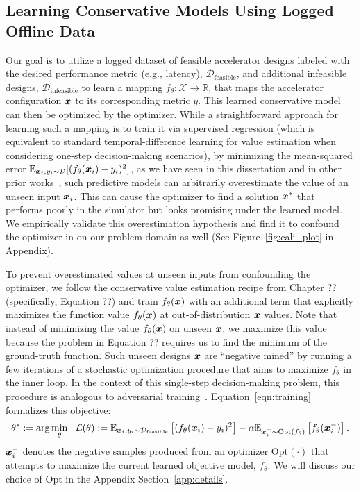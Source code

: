 \subsection{Learning Conservative Models Using Logged Offline Data}
Our goal is to utilize a logged dataset of feasible accelerator designs labeled with the desired performance metric (e.g., latency),  $\mathcal{D}_\text{feasible}$, and additional infeasible designs, $\mathcal{D}_\text{infeasible}$ to learn a mapping ${f}_\theta: \mathcal{X} \rightarrow \mathbb{R}$, that maps the accelerator configuration ${\boldsymbol{x}}$ to its corresponding metric $y$. This learned conservative model can then be optimized by the optimizer. While a straightforward approach for learning such a mapping is to train it via supervised regression (which is equivalent to standard temporal-difference learning for value estimation when considering one-step decision-making scenarios), by minimizing the mean-squared error $\mathbb{E}_{{\boldsymbol{x}}_i, y_i \sim \mathcal{D}}[(f_\theta({\boldsymbol{x}}_i) - y_i)^2]$, as we have seen in this dissertation and in other prior works~\citep{kumar2019model}, such predictive models can arbitrarily overestimate the value of an unseen input ${\boldsymbol{x}}_i$. This can cause the optimizer to find a solution ${\boldsymbol{x}}^*$ that performs poorly in the simulator but looks promising under the learned model. We empirically validate this overestimation hypothesis and find it to confound the optimizer in on our problem domain as well (See Figure~\ref{fig:cali_plot} in Appendix). 

To prevent overestimated values at unseen inputs from confounding the optimizer, we follow the conservative value estimation recipe from Chapter ?? (specifically, Equation ??) and train $f_\theta({\boldsymbol{x}})$ with an additional term that explicitly maximizes the function value $f_\theta({\boldsymbol{x}})$ at out-of-distribution ${\boldsymbol{x}}$ values. Note that instead of minimizing the value $f_\theta({\boldsymbol{x}})$ on unseen ${\boldsymbol{x}}$, we maximize this value because the problem in Equation ?? requires us to find the minimum of the ground-truth function. Such unseen designs ${\boldsymbol{x}}$ are ``negative mined'' by running a few iterations of a stochastic optimization procedure that aims to maximize $f_\theta$ in the inner loop. In the context of this single-step decision-making problem, this procedure is analogous to adversarial training~\citep{goodfellow2014explaining}. Equation~\ref{eqn:training} formalizes this objective:
\newcommand{\editcolor}{black}
\begin{equation}
\label{eqn:training}
    \theta^* := \arg \min_\theta~~ \mathcal{L}(\theta):= \E_{\rvx_i, y_i \sim \mathcal{D}_{\text{feasible}}} \left[ (f_\theta(\rvx_i) - y_i)^2 \right] - \alpha \E_{\rvx^{-}_i \sim \textcolor{\editcolor}{\mathrm{Opt}(f_\theta)}} \left[f_\theta(\rvx^-_i) \right].
\end{equation}
${\boldsymbol{x}}^{-}_i$ denotes the negative samples produced from an optimizer $\mathrm{Opt}(\cdot)$ that attempts to maximize the current learned objective model, $f_\theta$. We will discuss our choice of $\mathrm{Opt}$ in the Appendix Section~\ref{app:details}.  
 
